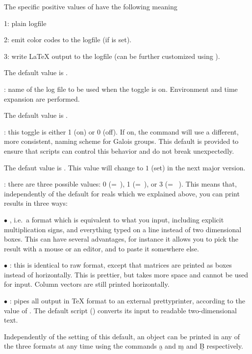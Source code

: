 The specific positive values of  have the following meaning

1: plain logfile

2: emit color codes to the logfile (if  is set).

3: write LaTeX output to the logfile (can be further customized using
).

The default value is .

: \label{se:def,logfile}name of the log file to be used when the  toggle is on.
Environment and time expansion are performed.

The default value is .

: \label{se:def,new_galois_format}this toggle is either 1 (on) or 0 (off). If on,
the  command will use a different, more
consistent, naming scheme for Galois groups. This default is provided to
ensure that scripts can control this behavior and do not break unexpectedly.

The defaut value is . This value will change to $1$ (set) in the next
major version.

: \label{se:def,output}there are three possible values: 0
(=~), 1 (=~), or 3
(=~ ). This
means that, independently of the default  for reals which we
explained above, you can print results in three ways:

$\bullet$ , i.e.~a format which is equivalent to what you
input, including explicit multiplication signs, and everything typed on a
line instead of two dimensional boxes. This can have several advantages, for
instance it allows you to pick the result with a mouse or an editor, and to
paste it somewhere else.

$\bullet$ : this is identical to raw format, except
that matrices are printed as boxes instead of horizontally. This is
prettier, but takes more space and cannot be used for input. Column vectors
are still printed horizontally.

$\bullet$ : pipes all 
output in TeX format to an external prettyprinter, according to the value of
. The default script () converts its input
to readable two-dimensional text.

Independently of the setting of this default, an object can be printed
in any of the three formats at any time using the commands \b{a} and \b{m}
and \b{B} respectively.

